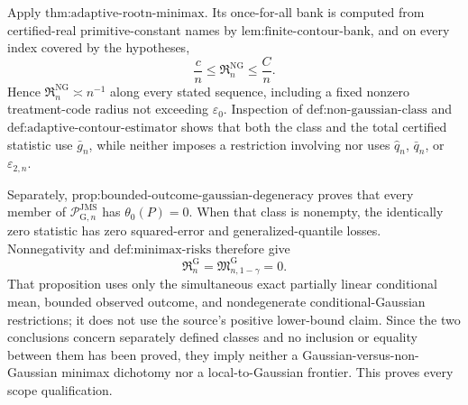 Apply \(\text{thm:adaptive-rootn-minimax}\). Its once-for-all bank is computed from certified-real primitive-constant names by \(\text{lem:finite-contour-bank}\), and on every index covered by the hypotheses,
\[
 \frac cn\le\mathfrak R_n^{\mathrm{NG}}\le\frac Cn.
\]
Hence \(\mathfrak R_n^{\mathrm{NG}}\asymp n^{-1}\) along every stated sequence, including a fixed nonzero treatment-code radius not exceeding \(\varepsilon_0\). Inspection of \(\text{def:non-gaussian-class}\) and \(\text{def:adaptive-contour-estimator}\) shows that both the class and the total certified statistic use \(\bar g_n\), while neither imposes a restriction involving nor uses \(\widehat q_n\), \(\bar q_n\), or \(\varepsilon_{2,n}\).

Separately, \(\text{prop:bounded-outcome-gaussian-degeneracy}\) proves that every member of \(\mathcal P_{\mathrm G,n}^{\mathrm{JMS}}\) has \(\theta_0(P)=0\). When that class is nonempty, the identically zero statistic has zero squared-error and generalized-quantile losses. Nonnegativity and \(\text{def:minimax-risks}\) therefore give
\[
 \mathfrak R_n^{\mathrm G}
 =\mathfrak M_{n,1-\gamma}^{\mathrm G}=0.
\]
That proposition uses only the simultaneous exact partially linear conditional mean, bounded observed outcome, and nondegenerate conditional-Gaussian restrictions; it does not use the source's positive lower-bound claim. Since the two conclusions concern separately defined classes and no inclusion or equality between them has been proved, they imply neither a Gaussian-versus-non-Gaussian minimax dichotomy nor a local-to-Gaussian frontier. This proves every scope qualification.